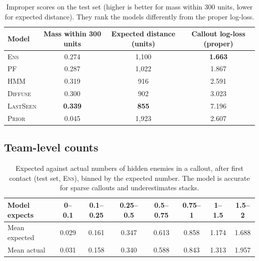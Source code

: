 \documentclass[11pt]{article}
\newcommand{\model}[1]{\textsc{#1}}
\newcommand{\1}{\mathbb{1}}
\begin{document}
\begin{table}[H]
\centering
\caption{Improper scores on the test set (higher is better for mass within 300 units, lower for expected distance). They rank the models differently from the proper log-loss.}
\label{tab:improper}
\small
\begin{tabular}{@{}lccc@{}}
\toprule
Model & Mass within 300 units & Expected distance (units) & Callout log-loss (proper) \\
\midrule
\model{Ens} & 0.274 & 1{,}100 & \textbf{1.663} \\
\model{PF} & 0.287 & 1{,}022 & 1.867 \\
\model{HMM} & 0.319 & 916 & 2.591 \\
\model{Diffuse} & 0.300 & 902 & 3.023 \\
\model{LastSeen} & \textbf{0.339} & \textbf{855} & 7.196 \\
\model{Prior} & 0.045 & 1{,}923 & 2.607 \\
\bottomrule
\end{tabular}
\end{table}

\subsection{Team-level counts}
\begin{table}[H]
\centering
\caption{Expected against actual numbers of hidden enemies in a callout, after first contact (test set, \model{Ens}), binned by the expected number. The model is accurate for sparse callouts and underestimates stacks.}
\label{tab:counts}
\small
\begin{tabular}{@{}lccccccc@{}}
\toprule
Model expects & 0--0.1 & 0.1--0.25 & 0.25--0.5 & 0.5--0.75 & 0.75--1 & 1--1.5 & 1.5--2 \\
\midrule
Mean expected & 0.029 & 0.161 & 0.347 & 0.613 & 0.858 & 1.174 & 1.688 \\
Mean actual & 0.031 & 0.158 & 0.340 & 0.588 & 0.843 & 1.313 & 1.957 \\
\bottomrule
\end{tabular}
\end{table}
\end{document}
